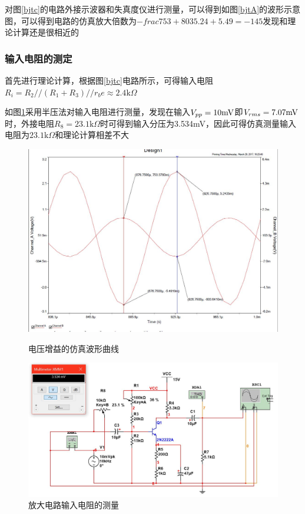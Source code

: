 \documentclass[UTF8,a4paper]{ctexart}
\begin{document}
对图\ref{bjtc}的电路外接示波器和失真度仪进行测量，可以得到如图\ref{bjtA}的波形示意图，可以得到电路的仿真放大倍数为$-frac{753+803}{5.24+5.49}=-145$发现和理论计算还是很相近的
\subsubsection{输入电阻的测定}
首先进行理论计算，根据图\ref{bjtc}电路所示，可得输入电阻$R_i=R_2//(R_1+R_3)//r_be\approx2.4\mathrm{k}\Omega$

如图\ref{bjtri}采用半压法对输入电阻进行测量，发现在输入$V_{pp}=10\rm{mV}$即$V_{rms}=7.07\rm{mV}$时，外接电阻$R_8=23.1\mathrm{k}\Omega$时可得到输入分压为3.534mV，因此可得仿真测量输入电阻为$23.1\mathrm{k}\Omega$和理论计算相差不大
\begin{figure}
\centering
\includegraphics[width=\textwidth]{1-2AA.jpg}
\caption{电压增益的仿真波形曲线}
\label{bjtA}
\includegraphics[width=\textwidth]{1-2Ri.jpg}
\caption{放大电路输入电阻的测量}
\label{bjtri}
\end{figure}
\end{document}
